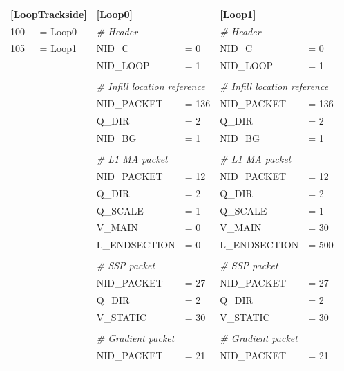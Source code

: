 	\begin{tabular}{|l l l l l l|}

		\hline

		\multicolumn{2}{|l}{ \begin{minipage}[t]{0.31\linewidth} \textbf{[LoopTrackside]} \end{minipage} } & \multicolumn{2}{l}{ \begin{minipage}[t]{0.31\linewidth} \textbf{[Loop0]} \end{minipage} } & \multicolumn{2}{l|}{ \begin{minipage}[t]{0.31\linewidth} \textbf{[Loop1]} \end{minipage} } \\
		100  &= Loop0 & \multicolumn{2}{l}{\emph{\# Header}} & \multicolumn{2}{l|}{\emph{\# Header}} \\
		105  &= Loop1 & NID\_C  &= 0 & NID\_C &= 0 \\
		& & NID\_LOOP  &= 1 & NID\_LOOP  &= 1 \\
		& & & & & \\
		& & \multicolumn{2}{l}{\emph{\# Infill location reference}} & \multicolumn{2}{l|}{\emph{\# Infill location reference}} \\
		& & NID\_PACKET &= 136 & NID\_PACKET &= 136 \\
		& & Q\_DIR &= 2 & Q\_DIR &= 2 \\
		& & NID\_BG &= 1 & NID\_BG &= 1 \\
		& & & & & \\
		& & \multicolumn{2}{l}{\emph{\# L1 MA packet}} & \multicolumn{2}{l|}{\emph{\# L1 MA packet}}  \\
		& & NID\_PACKET &= 12 & NID\_PACKET &= 12 \\
		& & Q\_DIR &= 2 & Q\_DIR &= 2 \\
		& & Q\_SCALE &= 1 & Q\_SCALE &= 1 \\
		& & V\_MAIN	&= 0 & V\_MAIN &= 30 \\
		& & L\_ENDSECTION &= 0 & L\_ENDSECTION &= 500 \\
		& & & & & \\
		& & \multicolumn{2}{l}{\emph{\# SSP packet}} & \multicolumn{2}{l|}{\emph{\# SSP packet}}  \\
		& & NID\_PACKET &= 27 & NID\_PACKET &= 27 \\
		& & Q\_DIR &= 2 & Q\_DIR &= 2 \\
		& & V\_STATIC &= 30 & V\_STATIC &= 30 \\
		& & & & & \\
		& & \multicolumn{2}{l}{\emph{\# Gradient packet}} & \multicolumn{2}{l|}{\emph{\# Gradient packet}}  \\
		& & NID\_PACKET &= 21 & NID\_PACKET &= 21 \\

		\hline

	\end{tabular}


